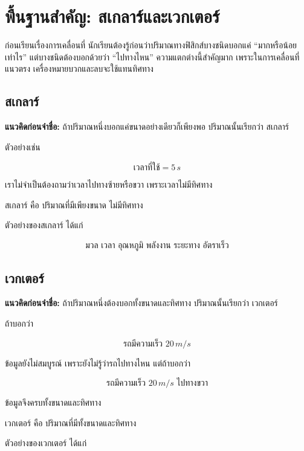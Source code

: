 \newpage{}

\section{พื้นฐานสำคัญ: สเกลาร์และเวกเตอร์}

ก่อนเรียนเรื่องการเคลื่อนที่ นักเรียนต้องรู้ก่อนว่าปริมาณทางฟิสิกส์บางชนิดบอกแค่ ``มากหรือน้อยเท่าไร'' แต่บางชนิดต้องบอกด้วยว่า ``ไปทางไหน'' ความแตกต่างนี้สำคัญมาก เพราะในการเคลื่อนที่แนวตรง เครื่องหมายบวกและลบจะใช้แทนทิศทาง

\subsection{สเกลาร์}

\textbf{แนวคิดก่อนจำชื่อ:} ถ้าปริมาณหนึ่งบอกแค่ขนาดอย่างเดียวก็เพียงพอ ปริมาณนั้นเรียกว่า สเกลาร์

ตัวอย่างเช่น

\[
\text{เวลาที่ใช้} = 5\,\si{s}
\]

เราไม่จำเป็นต้องถามว่าเวลาไปทางซ้ายหรือขวา เพราะเวลาไม่มีทิศทาง

\begin{tcolorbox}[title=นิยาม]
สเกลาร์ คือ ปริมาณที่มีเพียงขนาด ไม่มีทิศทาง
\end{tcolorbox}

ตัวอย่างของสเกลาร์ ได้แก่

\[
\text{มวล เวลา อุณหภูมิ พลังงาน ระยะทาง อัตราเร็ว}
\]

\subsection{เวกเตอร์}

\textbf{แนวคิดก่อนจำชื่อ:} ถ้าปริมาณหนึ่งต้องบอกทั้งขนาดและทิศทาง ปริมาณนั้นเรียกว่า เวกเตอร์

ถ้าบอกว่า

\[
\text{รถมีความเร็ว } 20\,\si{m/s}
\]

ข้อมูลยังไม่สมบูรณ์ เพราะยังไม่รู้ว่ารถไปทางไหน แต่ถ้าบอกว่า

\[
\text{รถมีความเร็ว } 20\,\si{m/s} \text{ ไปทางขวา}
\]

ข้อมูลจึงครบทั้งขนาดและทิศทาง

\begin{tcolorbox}[title=นิยาม]
เวกเตอร์ คือ ปริมาณที่มีทั้งขนาดและทิศทาง
\end{tcolorbox}

ตัวอย่างของเวกเตอร์ ได้แก่


